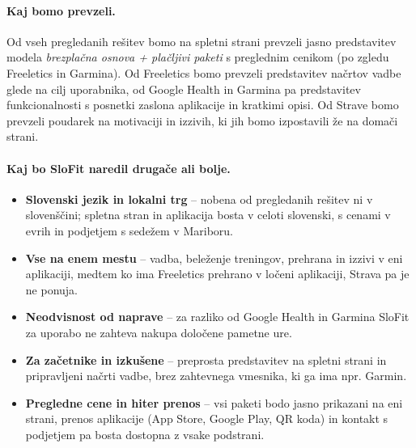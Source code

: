 \documentclass[11pt,a4paper]{article}
\begin{document}
\paragraph{Kaj bomo prevzeli.} Od vseh pregledanih rešitev bomo na spletni strani prevzeli jasno predstavitev modela \emph{brezplačna osnova + plačljivi paketi} s preglednim cenikom (po zgledu Freeletics in Garmina). Od Freeletics bomo prevzeli predstavitev načrtov vadbe glede na cilj uporabnika, od Google Health in Garmina pa predstavitev funkcionalnosti s posnetki zaslona aplikacije in kratkimi opisi. Od Strave bomo prevzeli poudarek na motivaciji in izzivih, ki jih bomo izpostavili že na domači strani.

\paragraph{Kaj bo SloFit naredil drugače ali bolje.}
\begin{itemize}
  \item \textbf{Slovenski jezik in lokalni trg} -- nobena od pregledanih rešitev ni v slovenščini; spletna stran in aplikacija bosta v celoti slovenski, s cenami v evrih in podjetjem s sedežem v Mariboru.
  \item \textbf{Vse na enem mestu} -- vadba, beleženje treningov, prehrana in izzivi v eni aplikaciji, medtem ko ima Freeletics prehrano v ločeni aplikaciji, Strava pa je ne ponuja.
  \item \textbf{Neodvisnost od naprave} -- za razliko od Google Health in Garmina SloFit za uporabo ne zahteva nakupa določene pametne ure.
  \item \textbf{Za začetnike in izkušene} -- preprosta predstavitev na spletni strani in pripravljeni načrti vadbe, brez zahtevnega vmesnika, ki ga ima npr. Garmin.
  \item \textbf{Pregledne cene in hiter prenos} -- vsi paketi bodo jasno prikazani na eni strani, prenos aplikacije (App Store, Google Play, QR koda) in kontakt s podjetjem pa bosta dostopna z vsake podstrani.
\end{itemize}
\end{document}
